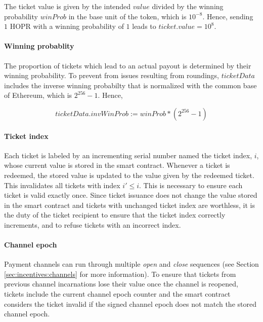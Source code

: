 The ticket value is given by the intended $value$ divided by the winning probability $winProb$ in the base unit of the token, which is $10^{-8}$. Hence, sending $1$ HOPR with a winning probability of $1$ leads to $ticket.value = 10^8$.

\paragraph{Winning probablity}
\label{sec:tickets:issuance:winningprobability}

The proportion of tickets which lead to an actual payout is determined by their winning probability. To prevent from issues resulting from roundings, $ticketData$ includes the inverse winning probabilty that is normalized with the common base of Ethereum, which is $2^{256} - 1$. Hence,

$$ ticketData.invWinProb := winProb * (2^{256} -1)$$

\paragraph{Ticket index}
\label{sec:tickets:issuance:ticketindex}

Each ticket is labeled by an incrementing serial number named the ticket index, $i$, whose current value is stored in the smart contract. Whenever a ticket is redeemed, the stored value is updated to the value given by the redeemed ticket. This invalidates all tickets with index $i' \le i$. This is necessary to ensure each ticket is valid exactly once. Since ticket issuance does not change the value stored in the smart contract and tickets with unchanged ticket index are worthless, it is the duty of the ticket recipient to ensure that the ticket index correctly increments, and to refuse tickets with an incorrect index.

\paragraph{Channel epoch}
\label{sec:tickets:issuance:channelepoch}

Payment channels can run through multiple \textit{open} and \textit{close} sequences (see Section \ref{sec:incentives:channels} for more information). To ensure that tickets from previous channel incarnations lose their value once the channel is reopened, tickets include the current channel epoch counter and the smart contract considers the ticket invalid if the signed channel epoch does not match the stored channel epoch.

